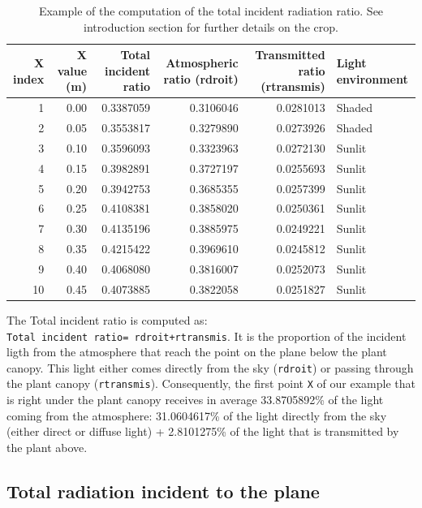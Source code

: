 \documentclass[
]{book}
\begin{document}
\begin{table}

\caption{\label{tab:unnamed-chunk-5}Example of the computation of the total incident radiation ratio. See introduction section for further details on the crop.}
\centering
\begin{tabular}[t]{r|r|r|r|r|l}
\hline
X index & X value (m) & Total incident ratio & Atmospheric ratio (rdroit) & Transmitted ratio (rtransmis) & Light environment\\
\hline
1 & 0.00 & 0.3387059 & 0.3106046 & 0.0281013 & Shaded\\
\hline
2 & 0.05 & 0.3553817 & 0.3279890 & 0.0273926 & Shaded\\
\hline
3 & 0.10 & 0.3596093 & 0.3323963 & 0.0272130 & Sunlit\\
\hline
4 & 0.15 & 0.3982891 & 0.3727197 & 0.0255693 & Sunlit\\
\hline
5 & 0.20 & 0.3942753 & 0.3685355 & 0.0257399 & Sunlit\\
\hline
6 & 0.25 & 0.4108381 & 0.3858020 & 0.0250361 & Sunlit\\
\hline
7 & 0.30 & 0.4135196 & 0.3885975 & 0.0249221 & Sunlit\\
\hline
8 & 0.35 & 0.4215422 & 0.3969610 & 0.0245812 & Sunlit\\
\hline
9 & 0.40 & 0.4068080 & 0.3816007 & 0.0252073 & Sunlit\\
\hline
10 & 0.45 & 0.4073885 & 0.3822058 & 0.0251827 & Sunlit\\
\hline
\end{tabular}
\end{table}

The Total incident ratio is computed as: \texttt{Total\ incident\ ratio=\ rdroit+rtransmis}. It is the proportion of the incident ligth from the atmosphere that reach the point on the plane below the plant canopy. This light either comes directly from the sky (\texttt{rdroit}) or passing through the plant canopy (\texttt{rtransmis}).
Consequently, the first point \texttt{X} of our example that is right under the plant canopy receives in average 33.8705892\% of the light coming from the atmosphere: 31.0604617\% of the light directly from the sky (either direct or diffuse light) + 2.8101275\% of the light that is transmitted by the plant above.

\hypertarget{total-radiation-incident-to-the-plane}{%
\subsection{Total radiation incident to the plane}\label{total-radiation-incident-to-the-plane}}
\end{document}
